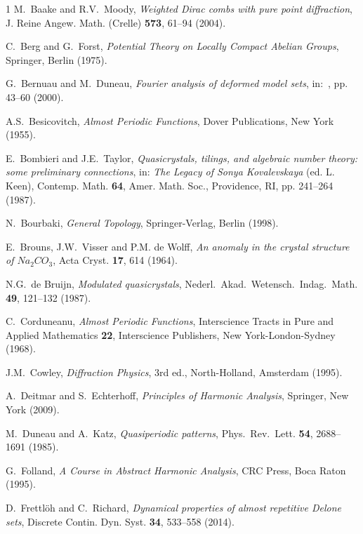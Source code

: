 \documentclass[11pt, a4wide]{amsart}
\numberwithin{lemma}{section}
\begin{document}
\begin{thebibliography}{1}
{M.~Baake and R.V.~Moody,
\textit{Weighted Dirac combs with pure point diffraction},
J. Reine Angew. Math.  (Crelle) {\bf 573}, 61--94 (2004).}



{C.~Berg and G.~Forst,
\textit{Potential Theory on Locally Compact Abelian Groups},
Springer, Berlin (1975).}


{G.~Bernuau and M.~Duneau,
\textit{Fourier analysis of deformed model sets},
in:~\cite{BMed}, pp. 43--60 (2000).}

{A.S.~Besicovitch, \textit{Almost Periodic Functions}, Dover Publications, New York (1955).}

{E.~Bombieri and J.E.~Taylor,
\textit{Quasicrystals, tilings, and algebraic number theory: some preliminary connections}, in: \textit{The Legacy of Sonya Kovalevskaya} (ed. L. Keen),
Contemp. Math. \textbf{64}, Amer. Math. Soc., Providence, RI, pp. 241--264 (1987).}

{N.~Bourbaki,
\textit{General Topology}, Springer-Verlag, Berlin (1998).}

{E.~Brouns, J.W.~Visser and P.M. de Wolff,
\textit{An anomaly in the crystal structure of $Na_2 CO_3$},
Acta Cryst. \textbf{17}, 614 (1964).}

{N.G.~de Bruijn, \textit{Modulated quasicrystals},
Nederl.~Akad.~Wetensch.~Indag.~Math. \textbf{49}, 121--132 (1987).}

{C.~Corduneanu, \textit{Almost Periodic Functions}, Interscience Tracts in Pure and Applied Mathematics \textbf{22}, Interscience Publishers, New York-London-Sydney (1968).}

{J.M.~Cowley,
\textit{Diffraction Physics}, 3rd ed.,
North-Holland, Amsterdam (1995).}

{A.~Deitmar and S.~Echterhoff, \textit{Principles of Harmonic Analysis}, Springer, New York (2009).}

{M.~Duneau and A.~Katz, \textit{Quasiperiodic patterns},  Phys.~Rev.~Lett. \textbf{54}, 2688--1691 (1985).}


{G.~Folland, \textit{A Course in Abstract Harmonic Analysis},
CRC Press, Boca Raton (1995).}

{D.~Frettl\"oh and C.~Richard, \textit{Dynamical properties of almost repetitive Delone sets},  Discrete Contin. Dyn. Syst. \textbf{34}, 533--558 (2014).}


\end{thebibliography}
\end{document}
